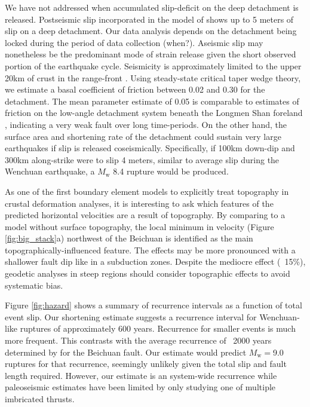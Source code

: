 \documentclass[12pt]{article}
\begin{document}
We have not addressed when accumulated slip-deficit on the deep detachment is released. Postseismic slip incorporated in the model of \cite{Qi2011} shows up to 5 meters of slip on a deep detachment. Our data analysis depends on the detachment being locked during the period of data collection (when?). Aseismic slip may nonetheless be the predominant mode of strain release given the short observed portion of the earthquake cycle. Seismicity is approximately limited to the upper 20km of crust in the range-front \citep{Li2010}. Using steady-state critical taper wedge theory, we estimate a basal coefficient of friction between 0.02 and 0.30 for the detachment. The mean parameter estimate of 0.05 is comparable to estimates of friction on the low-angle detachment system beneath the Longmen Shan foreland \citep{Hubbard2010}, indicating a very weak fault over long time-periods. On the other hand, the surface area and shortening rate of the detachment could sustain very large earthquakes if slip is released coseismically. Specifically, if 100km down-dip and 300km along-strike were to slip 4 meters, similar to average slip during the Wenchuan earthquake, a $M_{\textrm{w}}$ 8.4 rupture would be produced.

As one of the first boundary element models to explicitly treat topography in crustal deformation analyses, it is interesting to ask which features of the predicted horizontal velocities are a result of topography. By comparing to a model without surface topography, the local minimum in velocity (Figure \ref{fig:big_stack}a) northwest of the Beichuan is identified as the main topographically-influenced feature. The effects may be more pronounced with a shallower fault dip like in a subduction zones. Despite the mediocre effect (~15\%), geodetic analyses in steep regions should consider topographic effects to avoid systematic bias.

Figure \ref{fig:hazard} shows a summary of recurrence intervals as a function of total event slip. Our shortening estimate suggests a recurrence interval for Wenchuan-like ruptures of approximately 600 years. Recurrence for smaller events is much more frequent. This contrasts with the average recurrence of ~2000 years determined by \citep{Ran2010} for the Beichuan fault. Our estimate would predict $M_{\textrm{w}} = $9.0 ruptures for that recurrence, seemingly unlikely given the total slip and fault length required. However, our estimate is an system-wide recurrence while paleoseismic estimates have been limited by only studying one of multiple imbricated thrusts. 
\end{document}
